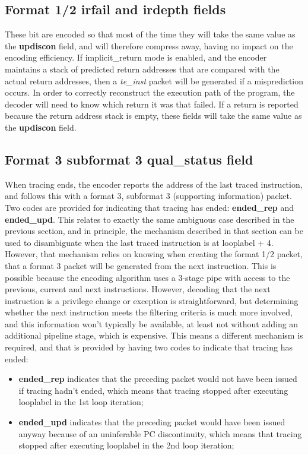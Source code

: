 \subsection{Format 1/2 \textbf{irfail} and \textbf{irdepth} fields}
These bit are encoded so that most of the time they will take the same value as the \textbf{updiscon} field,
and will therefore compress away, having no impact on the encoding efficiency.  If implicit\_return mode is enabled, and
the encoder maintains a stack of predicted return addresses that are compared with the actual return addresses, then
a \textit{te\_inst} packet will be generated if a misprediction occurs.  In order to correctly reconstruct the 
execution path of the program, the decoder will need to know which return it was that failed.  If a return is reported
because the return address stack is empty, these fields will take the same value as the \textbf{updiscon} field.

\subsection{Format 3 subformat 3 \textbf{qual\_status} field}

When tracing ends, the encoder reports the address of the last traced instruction, and follows this with a format 3, 
subformat 3 (supporting information) packet.  Two codes are provided for indicating that tracing has ended: 
\textbf{ended\_rep} and \textbf{ended\_upd}.  This relates to exactly the same ambiguous case described in the previous
section, and in principle, the mechanism described in that section can be used to disambiguate when the last traced
instruction is at looplabel + 4.  However, that mechanism relies on knowing when creating the format 1/2 packet, that 
a format 3 packet will be generated from the next instruction.  This is possible because the encoding algorithm uses 
a 3-stage pipe with access to the previous, current and next instructions.  However, decoding that the next instruction
is a privilege change or exception is straightforward, but determining whether the next instruction meets the filtering
criteria is much more involved, and this information won't typically be available, at least not without adding an
additional pipeline stage, which is expensive.  This means a different mechanism is required, and that is provided
by having two codes to indicate that tracing has ended:

\begin{itemize}
  \item \textbf{ended\_rep} indicates that the preceding packet would not have been issued if tracing hadn't ended, 
    which means that tracing stopped after executing looplabel in the 1st loop iteration;
  \item \textbf{ended\_upd} indicates that the preceding packet would have been issued anyway because of an uninferable
    PC discontinuity, which means that tracing stopped after executing looplabel in the 2nd loop iteration;
\end{itemize}

